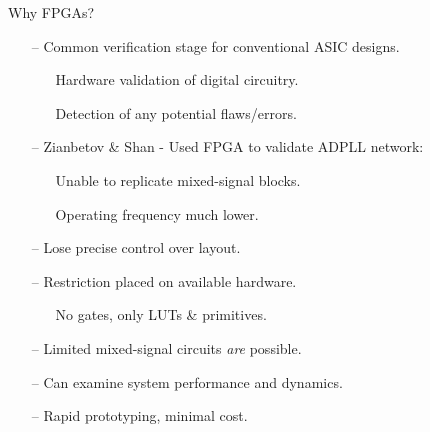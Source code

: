 \documentclass{beamer}
\begin{document}
\begin{frame}{Why FPGAs?}

    \begin{itemize}
		\item[--]
			Common verification stage for conventional ASIC designs.
			\begin{itemize}
				\item[]
				Hardware validation of digital circuitry.
				\item[]
				Detection of any potential flaws/errors.
			\end{itemize}
		\item[--]
			Zianbetov \& Shan - Used FPGA to validate ADPLL network:
		\begin{itemize}
			\item[]
				Unable to replicate mixed-signal blocks.
			\item[]
				Operating frequency much lower.
		\end{itemize}
		\item[--]
			Lose precise control over layout.
		\item[--]
			Restriction placed on available hardware.
			\begin{itemize}
				\item[]
					No gates, only LUTs \& primitives.
			\end{itemize} 
		\item[--]
			Limited mixed-signal circuits \textit{are} possible.
		\item[--]
			Can examine system performance and dynamics.
		\item[--]
			Rapid prototyping, minimal cost.	
	
	\end{itemize}
\end{frame}
\end{document}
